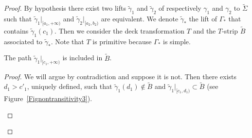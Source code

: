 \begin{proof}
By hypothesis there exist two lifts $\tilde\gamma_1$ and $\tilde\gamma_2$ of respectively $\gamma_1$ and $\gamma_2$ to $\tilde\Sigma$ such that $\tilde\gamma_1|_{[a_1, +\infty)}$ and $\tilde\gamma_2|_{[a_2, b_2)}$ are equivalent. We denote $\tilde \gamma_*$ the lift of $\Gamma_*$ that contains $\tilde\gamma_1(c_1)$. Then we consider the deck transformation $T$ and the $T$-strip $\tilde B$ associated to $\tilde\gamma_*$. Note that $T$ is primitive because $\Gamma_*$ is simple.

\begin{lemm}\label{LemInclus}
The path $\tilde\gamma_1|_{[c_1,+\infty)}$ is included in $\tilde B$.
\end{lemm}

\begin{proof}
We will argue by contradiction and suppose it is not. Then there exists $d_1>c'_1$, uniquely defined, such that $\tilde\gamma_1(d_1)\notin\tilde B$ and $\tilde\gamma_1\vert_{[c_1,d_1)}\subset\tilde B$ (see Figure~\ref{Fignontransitivity3}).

\begin{figure}
\begin{center}

\end{center}
\end{figure}
\end{proof}
\end{proof}
